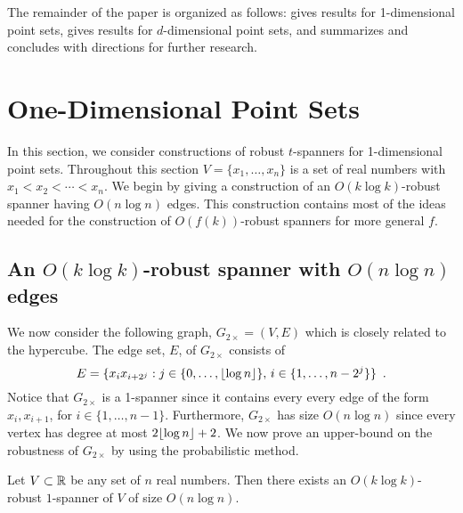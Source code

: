\documentclass{patmorin}
\begin{document}
The remainder of the paper is organized as follows:  
gives results for 1-dimensional point sets,  gives results
for $d$-dimensional point sets, and  summarizes and
concludes with directions for further research.


\section{One-Dimensional Point Sets}

In this section, we consider constructions of robust $t$-spanners for
1-dimensional point sets.  Throughout this section $V=\{x_1,\ldots,x_n\}$
is a set of real numbers with $x_1<x_2<\cdots<x_n$.  We begin by giving
a construction of an $O(k\log k)$-robust spanner having $O(n\log n)$
edges.  This construction contains most of the ideas needed for the
construction of $O(f(k))$-robust spanners for more general $f$.

\subsection{An $O(k\log k)$-robust spanner with $O(n\log n)$ edges}

We now consider the following graph, $G_{2\times}=(V,E)$ which is
closely related to the hypercube.   The edge set, $E$, of $G_{2\times}$
consists of
\[
  E = \{x_ix_{i+2^j} : j\in\{0,\ldots,{\lfloor \log n \rfloor}\},\, 
        i\in\{1,\ldots,n-2^j\} \} \enspace .
\] 
Notice that $G_{2\times}$ is a 1-spanner since it contains every every
edge of the form $x_i,x_{i+1}$, for $i\in\{1,\ldots,n-1\}$. Furthermore,
$G_{2\times}$ has size $O(n\log n)$ since every vertex has degree at most
$2{\lfloor \log n \rfloor}+2$.  We now prove an upper-bound on the robustness of
$G_{2\times}$ by using the probabilistic method.

\begin{thm}
  Let $V\subset \mathbb{R}$ be any set of $n$ real numbers.  Then there exists
  an $O(k\log k)$-robust $1$-spanner of $V$ of size $O(n\log n)$.
\end{thm}
\end{document}
